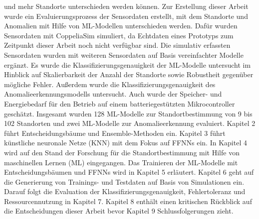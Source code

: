 und mehr Standorte unterschieden werden können.
\newline
\newline
Zur Erstellung dieser Arbeit wurde ein Evaluierungsprozess der Sensordaten erstellt, mit dem Standorte und Anomalien mit Hilfe von ML-Modellen unterschieden werden.
Dafür wurden Sensordaten mit CoppeliaSim simuliert, da Echtdaten eines Prototyps zum Zeitpunkt dieser Arbeit noch nicht verfügbar sind.
Die simulativ erfassten Sensordaten wurden mit weiteren Sensordaten auf Basis vereinfachter Modelle ergänzt.
Es wurde die Klassifizierungsgenauigkeit der ML-Modelle untersucht im Hinblick auf Skalierbarkeit der Anzahl der Standorte sowie Robustheit gegenüber mögliche Fehler.
Außerdem wurde die Klassifizierungsgenauigkeit des Anomalieerkennungsmodells untersucht.
Auch wurde der Speicher- und Energiebedarf für den Betrieb auf einem batteriegestützten Mikrocontroller geschätzt.
Insgesamt wurden 128 ML-Modelle zur Standortbestimmung von 9 bis 102 Standorten und zwei ML-Modelle zur Anomalieerkennung evaluiert.
\newline
\newline
Kapitel 2 führt Entscheidungsbäume und Ensemble-Methoden ein.
Kapitel 3 führt künstliche neuronale Netze (KNN) mit dem Fokus auf FFNNs ein.
In Kapitel 4 wird auf den Stand der Forschung für die Standortbestimmung mit Hilfe von maschinellen Lernen (ML) eingegangen.
Das Trainieren der ML-Modelle mit Entscheidungsbäumen und FFNNs wird in Kapitel 5 erläutert.
Kapitel 6 geht auf die Generierung von Trainings- und Testdaten auf Basis von Simulationen ein.
Darauf folgt die Evaluation der Klassifizierungsgenauigkeit, Fehlertoleranz und Ressourcennutzung in Kapitel 7.
Kapitel 8 enthält einen kritischen Rückblick auf die Entscheidungen dieser Arbeit bevor Kapitel 9 Schlussfolgerungen zieht.